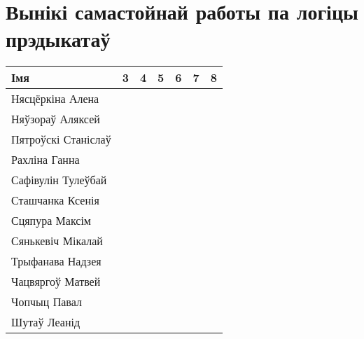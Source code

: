 


	\section{Вынікі самастойнай работы па логіцы прэдыкатаў}
\begin{table}[H]
	\begin{tabular}{|l|c|c|c|c|c|c|}
		\hline
		Імя                     & 3  & 4   & 5   & 6  & 7   & 8  \\ \hline
		Нясцёркіна Алена        &    &     &     &    &     &    \\ \hline
		Няўзораў Аляксей        &    &     &     &    &     &    \\ \hline
		Пятроўскі Станіслаў     &    &     &     &    &     &    \\ \hline
		Рахліна Ганна           &    &     &     &    &     &    \\ \hline
		Сафівулін Тулеўбай      &    &     &     &    &     &    \\ \hline
		Сташчанка Ксенія        &    &     &     &    &     &    \\ \hline
		Сцяпура Максім          &    &     &     &    &     &    \\ \hline
		Сянькевіч Мікалай       &    &     &     &    &     &    \\ \hline
		Трыфанава Надзея        &    &     &     &    &     &    \\ \hline
		Чацвяргоў Матвей        &    &     &     &    &     &    \\ \hline
		Чопчыц Павал            &    &     &     &    &     &    \\ \hline
		Шутаў Леанід            &    &     &     &    &     &    \\ \hline
	\end{tabular}
\end{table}

